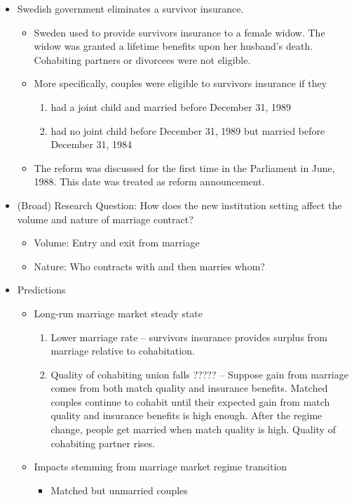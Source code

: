 \documentclass[a4paper, 12pt]{article}
\begin{document}
\begin{itemize}
\item Swedish government eliminates a survivor insurance.
\begin{itemize}
\item Sweden used to provide survivors insurance to a female widow. The widow was granted a lifetime benefits upon her husband's death. Cohabiting partners or divorcees were not eligible.
\item More specifically, couples were eligible to survivors insurance if they
\begin{enumerate}
\item had a joint child and married before December 31, 1989 
\item had no joint child before December 31, 1989 but married before December 31, 1984
\end{enumerate}
\item The reform was discussed for the first time in the Parliament in June, 1988. This date was treated as reform announcement.
\end{itemize}
\item (Broad) Research Question: How does the new institution setting affect the volume and nature of marriage contract?
\begin{itemize}
\item Volume: Entry and exit from marriage
\item Nature: Who contracts with and then marries whom?
\end{itemize}
\item Predictions
\begin{itemize}
\item Long-run marriage market steady state
\begin{enumerate}
\item Lower marriage rate -- survivors insurance provides surplus from marriage relative to cohabitation.
\item Quality of cohabiting union falls ????? -- Suppose gain from marriage comes from both match quality and insurance benefits. Matched couples continue to cohabit until their expected gain from match quality and insurance benefits is high enough. After the regime change, people get married when match quality is high. Quality of cohabiting partner rises.
\end{enumerate}
\item Impacts stemming from marriage market regime transition
\begin{itemize}
\item Matched but unmarried couples

\end{itemize}
\end{itemize}
\end{itemize}
\end{document}
